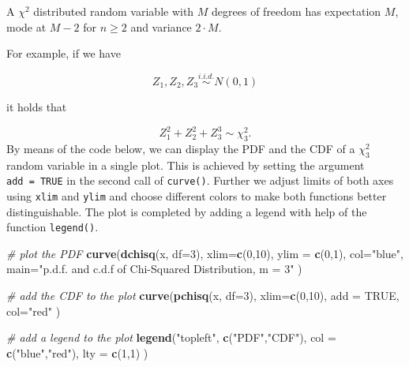 \documentclass[]{book}
\newenvironment{Shaded}{\begin{snugshade}}{\end{snugshade}}
\newcommand{\KeywordTok}[1]{\textcolor[rgb]{0.13,0.29,0.53}{\textbf{#1}}}
\newcommand{\DataTypeTok}[1]{\textcolor[rgb]{0.13,0.29,0.53}{#1}}
\newcommand{\DecValTok}[1]{\textcolor[rgb]{0.00,0.00,0.81}{#1}}
\newcommand{\StringTok}[1]{\textcolor[rgb]{0.31,0.60,0.02}{#1}}
\newcommand{\CommentTok}[1]{\textcolor[rgb]{0.56,0.35,0.01}{\textit{#1}}}
\newcommand{\OtherTok}[1]{\textcolor[rgb]{0.56,0.35,0.01}{#1}}
\newcommand{\NormalTok}[1]{#1}
\theoremstyle{definition}
\theoremstyle{definition}
\theoremstyle{definition}
\theoremstyle{remark}
\begin{document}
A \(\chi^2\) distributed random variable with \(M\) degrees of freedom
has expectation \(M\), mode at \(M-2\) for \(n \geq 2\) and variance
\(2 \cdot M\).

For example, if we have

\[ Z_1,Z_2,Z_3 \overset{i.i.d.}{\sim} N(0,1) \]

it holds that

\[ Z_1^2+Z_2^2+Z_3^3 \sim \chi^2_3. \tag{2.3} \] By means of the code
below, we can display the PDF and the CDF of a \(\chi^2_3\) random
variable in a single plot. This is achieved by setting the argument
\texttt{add\ =\ TRUE} in the second call of \texttt{curve()}. Further we
adjust limits of both axes using \texttt{xlim} and \texttt{ylim} and
choose different colors to make both functions better distinguishable.
The plot is completed by adding a legend with help of the function
\texttt{legend()}.

\begin{Shaded}
\begin{Highlighting}[]
\CommentTok{# plot the PDF}
\KeywordTok{curve}\NormalTok{(}\KeywordTok{dchisq}\NormalTok{(x, }\DataTypeTok{df=}\DecValTok{3}\NormalTok{), }
      \DataTypeTok{xlim=}\KeywordTok{c}\NormalTok{(}\DecValTok{0}\NormalTok{,}\DecValTok{10}\NormalTok{), }
      \DataTypeTok{ylim =} \KeywordTok{c}\NormalTok{(}\DecValTok{0}\NormalTok{,}\DecValTok{1}\NormalTok{), }
      \DataTypeTok{col=}\StringTok{"blue"}\NormalTok{, }
      \DataTypeTok{main=}\StringTok{"p.d.f. and c.d.f of Chi-Squared Distribution, m = 3"}
\NormalTok{      )}

\CommentTok{# add the CDF to the plot}
\KeywordTok{curve}\NormalTok{(}\KeywordTok{pchisq}\NormalTok{(x, }\DataTypeTok{df=}\DecValTok{3}\NormalTok{), }
      \DataTypeTok{xlim=}\KeywordTok{c}\NormalTok{(}\DecValTok{0}\NormalTok{,}\DecValTok{10}\NormalTok{), }
      \DataTypeTok{add =} \OtherTok{TRUE}\NormalTok{, }
      \DataTypeTok{col=}\StringTok{"red"}
\NormalTok{      )}

\CommentTok{# add a legend to the plot}
\KeywordTok{legend}\NormalTok{(}\StringTok{"topleft"}\NormalTok{, }
       \KeywordTok{c}\NormalTok{(}\StringTok{"PDF"}\NormalTok{,}\StringTok{"CDF"}\NormalTok{), }
       \DataTypeTok{col =} \KeywordTok{c}\NormalTok{(}\StringTok{"blue"}\NormalTok{,}\StringTok{"red"}\NormalTok{), }
       \DataTypeTok{lty =} \KeywordTok{c}\NormalTok{(}\DecValTok{1}\NormalTok{,}\DecValTok{1}\NormalTok{)}
\NormalTok{       )}
\end{Highlighting}
\end{Shaded}
\end{document}
